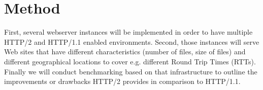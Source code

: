 \section{Method}
\label{method}
First, several webserver instances will be implemented in order to have multiple HTTP/2 and HTTP/1.1 enabled environments. Second, those instances will serve  Web sites that have different characteristics (number of files, size of files) and different geographical locations to cover e.g. different Round Trip Times (RTTs). Finally we will conduct benchmarking based on that infrastructure to outline the improvements or drawbacks HTTP/2 provides in comparison to HTTP/1.1.
